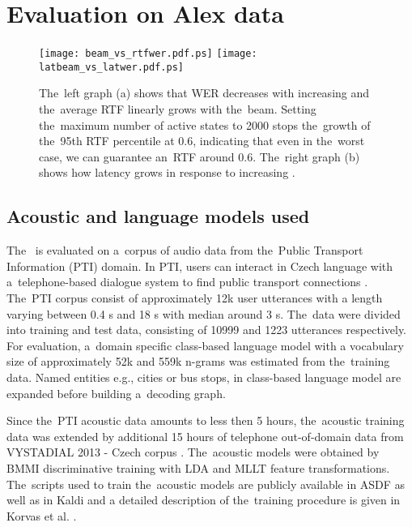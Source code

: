 \section{Evaluation on Alex data}
\label{sec:eval}

\begin{figure*}[t]
    \begin{center}
    \texttt{[image: beam\_vs\_rtfwer.pdf.ps]}
    \texttt{[image: latbeam\_vs\_latwer.pdf.ps]}
    \caption{The~left graph (a) shows that WER decreases with increasing  and the~average RTF linearly grows with the~beam.
    Setting the~maximum number of active states to 2000 stops the~growth of the~95th RTF percentile at 0.6, indicating that even in the~worst case, we can guarantee an~RTF around 0.6.
    The~right graph (b) shows how latency grows in response to increasing .}
    \label{fig:wer} 
    \end{center}
\end{figure*}

\subsection{Acoustic and language models used}
\label{sec:train}

The~ is evaluated on a~corpus of audio data from the~Public Transport Information (PTI) domain.
In PTI, users can interact in Czech language with a~telephone-based dialogue system to find public transport connections \cite{ptics2014url}.
The~PTI corpus consist of approximately 12k user utterances with a length varying between 0.4 s and 18 s with median around 3 s.
The~data were divided into training and test data, consisting of 10999 and 1223 utterances respectively.
For evaluation, a~domain specific class-based language model with a vocabulary size of approximately 52k  and 559k n-grams was estimated from the~training data.
Named entities e.g., cities or bus stops, in class-based language model are expanded before building a~decoding graph.

Since the~PTI acoustic data amounts to less then 5 hours, the~acoustic training data was extended by additional 15 hours of telephone out-of-domain data from VYSTADIAL 2013 - Czech corpus \cite{korvas_2014}.
The~acoustic models were obtained by BMMI discriminative training with LDA and MLLT feature transformations.
The~scripts used to train the~acoustic models are publicly available in ASDF \cite{asdf2014url} as well as in Kaldi \cite{kaldi2014url} and a detailed description of the~training procedure is given in Korvas et al. \cite{korvas_2014}.


